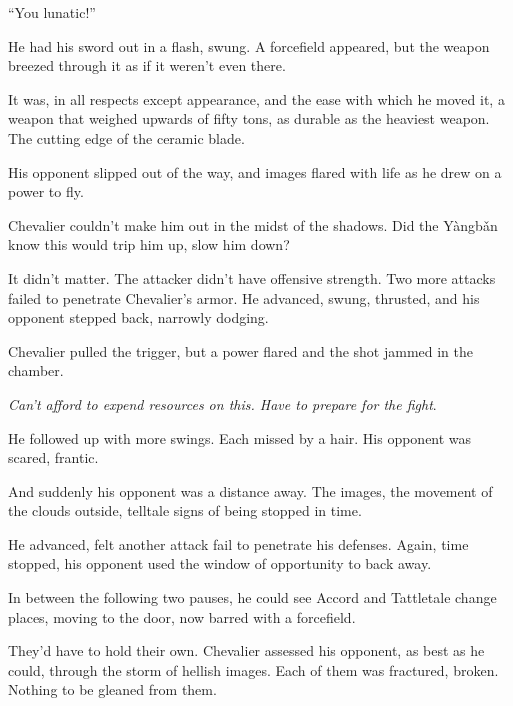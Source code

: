 ``You lunatic!''



He had his sword out in a flash, swung.  A forcefield appeared, but the weapon breezed through it as if it weren't even there.



It was, in all respects except appearance, and the ease with which he moved it, a weapon that weighed upwards of fifty tons, as durable as the heaviest weapon.  The cutting edge of the ceramic blade.



His opponent slipped out of the way, and images flared with life as he drew on a power to fly.



Chevalier couldn't make him out in the midst of the shadows.  Did the Y\`{a}ngb\v{a}n know this would trip him up, slow him down?



It didn't matter.  The attacker didn't have offensive strength.  Two more attacks failed to penetrate Chevalier's armor.  He advanced, swung, thrusted, and his opponent stepped back, narrowly dodging.



Chevalier pulled the trigger, but a power flared and the shot jammed in the chamber.



\emph{Can't afford to expend resources on this.  Have to prepare for the fight}.



He followed up with more swings.  Each missed by a hair.  His opponent was scared, frantic.



And suddenly his opponent was a distance away.  The images, the movement of the clouds outside, telltale signs of being stopped in time.



He advanced, felt another attack fail to penetrate his defenses.  Again, time stopped, his opponent used the window of opportunity to back away.



In between the following two pauses, he could see Accord and Tattletale change places, moving to the door, now barred with a forcefield.



They'd have to hold their own.  Chevalier assessed his opponent, as best as he could, through the storm of hellish images.  Each of them was fractured, broken.  Nothing to be gleaned from them.



